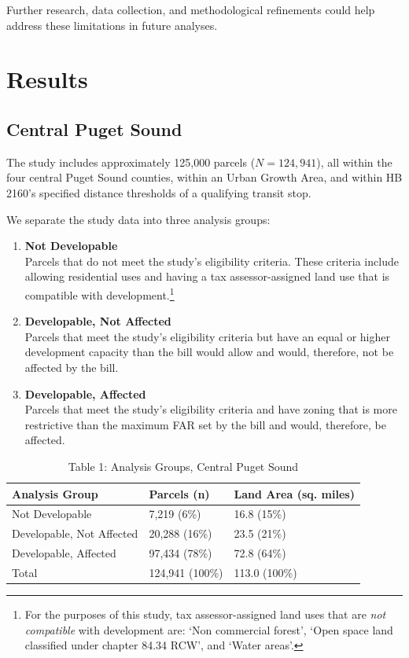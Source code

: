 \documentclass[
]{agujournal2019}
\begin{document}
Further research, data collection, and methodological refinements could
help address these limitations in future analyses.

\section{Results}\label{results}

\subsection{Central Puget Sound}\label{central-puget-sound}

The study includes approximately 125,000 parcels (\(N = 124,941\)), all
within the four central Puget Sound counties, within an Urban Growth
Area, and within HB 2160's specified distance thresholds of a qualifying
transit stop.

We separate the study data into three analysis groups:

\begin{enumerate}
\def\labelenumi{\arabic{enumi}.}
\item
  \textbf{Not Developable}\\
  Parcels that do not meet the study's eligibility criteria. These
  criteria include allowing residential uses and having a tax
  assessor-assigned land use that is compatible with
  development.\footnote{For the purposes of this study, tax
    assessor-assigned land uses that are \emph{not compatible} with
    development are: `Non commercial forest', `Open space land
    classified under chapter 84.34 RCW', and `Water areas'.}
\item
  \textbf{Developable, Not Affected}\\
  Parcels that meet the study's eligibility criteria but have an equal
  or higher development capacity than the bill would allow and would,
  therefore, not be affected by the bill.
\item
  \textbf{Developable, Affected}\\
  Parcels that meet the study's eligibility criteria and have zoning
  that is more restrictive than the maximum FAR set by the bill and
  would, therefore, be affected.
\end{enumerate}

\begin{table}
\caption{Table 1: Analysis Groups, Central Puget Sound}\tabularnewline

\centering
\begin{tabular}{l|l|l}
\hline
Analysis Group & Parcels (n) &  Land Area (sq. miles)\\
\hline
Not Developable & 7,219   (6\%) & 16.8  (15\%)\\
\hline
Developable, Not Affected & 20,288  (16\%) & 23.5  (21\%)\\
\hline
Developable, Affected & 97,434  (78\%) & 72.8  (64\%)\\
\hline
Total & 124,941 (100\%) & 113.0 (100\%)\\
\hline
\end{tabular}
\end{table}
\end{document}
